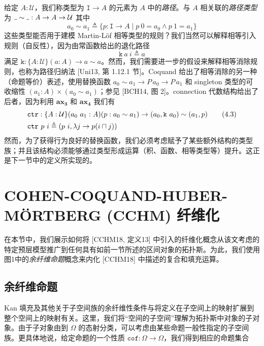 \documentclass{ctexart}
\theoremstyle{plain}
\theoremstyle{definition}
\theoremstyle{definition}
\theoremstyle{definition}
\theoremstyle{definition}
\newcommand\ttI{\mathtt{I}}
\newcommand\ttk{\mathtt{k}}
\newcommand{\ax}[1]{\mathbf{ax_{#1}}}
\newcommand{\ul}{{\rule[0ex]{0.4em}{0.4pt}}} %
\numberwithin{equation}{section}
\begin{document}
给定 $ A : \mathcal{U} $，我们称类型为 $ \ttI \to A $ 的元素为 $ A $ 中的\textit{路径}。与 $ A $ 相关联的\textit{路径类型}为 $\ul\sim\ul : A \to A \to \mathcal{U}$  
其中  
\begin{equation}
 a_0 \sim a_1 \triangleq \{ p : \ttI \to A \mid p\ 0 = a_0 \land p\ 1 = a_1 \} \end{equation}
这些类型能否用于建模 Martin-Löf 相等类型的规则？我们当然可以解释相等引入规则（自反性），因为由常函数给出的退化路径  
\begin{equation} \ttk \ a \ i \triangleq a \end{equation}  
满足 $\ttk : \{ A : \mathcal{U} \} (a : A) \to a \sim a $。然而，我们需要进一步的假设来解释相等消除规则，也称为路径归纳法 [Uni13, 第 1.12.1 节]。Coquand 给出了相等消除的另一种（命题等价）表述，使用替换函数 $ a_0 \sim a_1 \to P \, a_0 \to P \, a_1 $ 和 singleton 类型的可收缩性 $ (a_1 : A) \times (a_0 \sim a_1) $；参见 [BCH14, 图 2]。connection 代数结构给出了后者，因为利用 $ \ax{3} $ 和 $ \ax{4} $ 我们有  
\begin{align} &\mathtt{ctr} : \{ A : \mathcal{U} \} (a_0 \ a_1 : A) (p : a_0 \sim a_1) \to (a_0, \ttk \ a_0) \sim (a_1, p) \tag{4.3} \\  
 &\mathtt{ctr} \ p \ i \triangleq (p \ i, \lambda j \to p(i \sqcap j)) \notag\end{align}
然而，为了获得行为良好的替换函数，我们必须考虑赋予了某些额外结构的类型族；并且该结构必须能够通过类型形成运算（积、函数、相等类型等）提升。这正是下一节中的定义所实现的。

\section{COHEN-COQUAND-HUBER-MÖRTBERG (CCHM) 纤维化}

在本节中，我们展示如何将 [CCHM18, 定义13] 中引入的纤维化概念从该文考虑的特定预层模型推广到任何具有如前一节所述的区间对象的拓扑斯。为此，我们使用图1中的\textit{余纤维命题}概念来内化 [CCHM18] 中描述的复合和填充运算。

\subsection{余纤维命题}

Kan 填充及其他关于子空间族的余纤维性条件与将定义在子空间上的映射扩展到整个空间上的映射有关。这里，我们将“空间的子空间”理解为拓扑斯中对象的子对象。由于子对象由到 $\Omega$ 的态射分类，可以考虑由某些命题一般性指定的子空间族。更具体地说，给定命题的一个性质 $\mathtt{cof} : \Omega \to \Omega$，我们得到相应的命题集合
\end{document}
